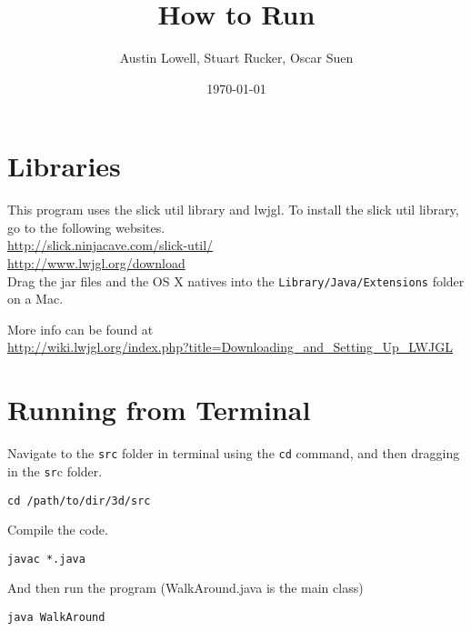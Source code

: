 \documentclass[12pt]{article}
\title{How to Run}
\author{Austin Lowell, Stuart Rucker, Oscar Suen}
\date{\today}
\begin{document}
\maketitle
\section{Libraries}
This program uses the slick util library and lwjgl. To install the slick util library, go to the following websites.\\
\url{http://slick.ninjacave.com/slick-util/}\\
\url{http://www.lwjgl.org/download}\\

Drag the jar files and the OS X natives into the \texttt{Library/Java/Extensions} folder on a Mac.

More info can be found at\\
\url{http://wiki.lwjgl.org/index.php?title=Downloading_and_Setting_Up_LWJGL}

\section{Running from Terminal}
Navigate to the \texttt{src} folder in terminal using the \texttt{cd} command, and then dragging in the \texttt{sr}c folder.
\begin{verbatim}
cd /path/to/dir/3d/src 
\end{verbatim} 
Compile the code.
\begin{verbatim}
javac *.java
\end{verbatim} 
And then run the program (WalkAround.java is the main class)
\begin{verbatim}
java WalkAround
\end{verbatim} 
\end{document}

